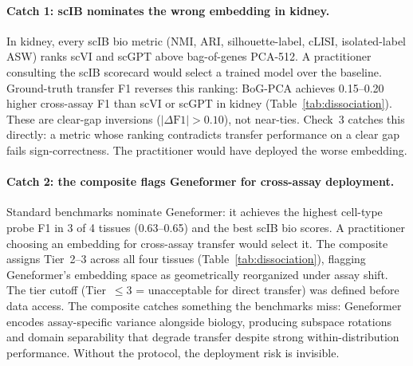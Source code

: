 \documentclass[9pt,lineno]{elife}
\begin{document}
\paragraph{Catch 1: scIB nominates the wrong embedding in kidney.} In kidney, every scIB bio metric (NMI, ARI, silhouette-label, cLISI, isolated-label ASW) ranks scVI and scGPT above bag-of-genes PCA-512. A practitioner consulting the scIB scorecard would select a trained model over the baseline. Ground-truth transfer F1 reverses this ranking: BoG-PCA achieves 0.15--0.20 higher cross-assay F1 than scVI or scGPT in kidney (Table~\ref{tab:dissociation}). These are clear-gap inversions ($|\Delta\text{F1}| > 0.10$), not near-ties. Check~3 catches this directly: a metric whose ranking contradicts transfer performance on a clear gap fails sign-correctness. The practitioner would have deployed the worse embedding.

\paragraph{Catch 2: the composite flags Geneformer for cross-assay deployment.} Standard benchmarks nominate Geneformer: it achieves the highest cell-type probe F1 in 3 of 4 tissues (0.63--0.65) and the best scIB bio scores. A practitioner choosing an embedding for cross-assay transfer would select it. The composite assigns Tier~2--3 across all four tissues (Table~\ref{tab:dissociation}), flagging Geneformer's embedding space as geometrically reorganized under assay shift. The tier cutoff (Tier~$\leq 3$ = unacceptable for direct transfer) was defined before data access. The composite catches something the benchmarks miss: Geneformer encodes assay-specific variance alongside biology, producing subspace rotations and domain separability that degrade transfer despite strong within-distribution performance. Without the protocol, the deployment risk is invisible.
\end{document}
